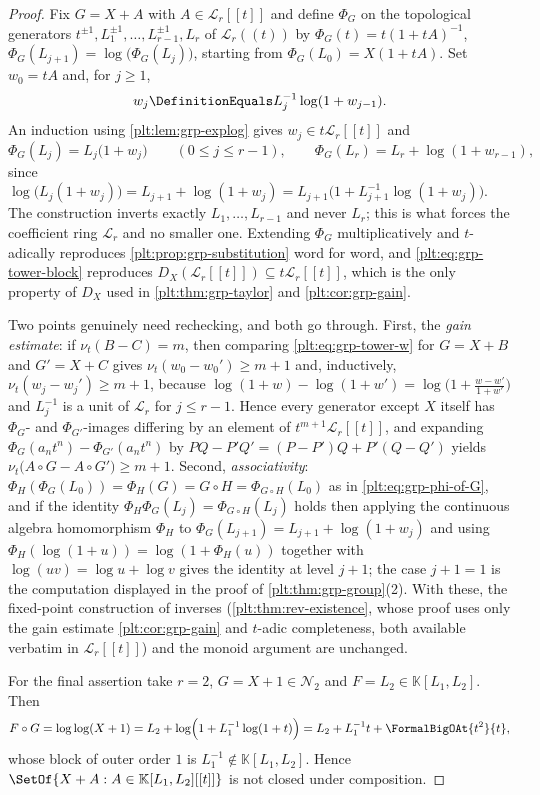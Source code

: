 \documentclass[11pt,oneside]{article}
\theoremstyle{plain}
\theoremstyle{definition}
\theoremstyle{remark}
\newcommand{\K}{\mathbb{K}}
\newcommand{\ordt}{\nu_{t}}                              %
\newcommand{\DX}{D_{X}}                                  %
\newcommand{\compose}{\mathbin{\circ}}
\begin{document}
\begin{proof}
Fix \(G=X+A\) with \(A\in\mathcal L_r[[t]]\) and define \(\Phi_G\) on the
topological generators \(t^{\pm1},L_1^{\pm1},\ldots,L_{r-1}^{\pm1},L_r\) of
\(\mathcal L_r((t))\) by \(\Phi_G(t)=t(1+tA)^{-1}\),
\(\Phi_G(L_{j+1})=\log\bigl(\Phi_G(L_j)\bigr)\), starting from
\(\Phi_G(L_0)=X(1+tA)\).  Set \(w_0=tA\) and, for \(j\ge1\),
\begin{equation}\label{plt:eq:grp-tower-w}
  w_j\DefinitionEquals L_j^{-1}\log(1+w_{j-1}).
\end{equation}
An induction using \cref{plt:lem:grp-explog} gives
\(w_j\in t\mathcal L_r[[t]]\) and
\[
  \Phi_G(L_j)=L_j\bigl(1+w_j\bigr)
  \qquad(0\le j\le r-1),
  \qquad
  \Phi_G(L_r)=L_r+\log(1+w_{r-1}),
\]
since \(\log\bigl(L_j(1+w_j)\bigr)=L_{j+1}+\log(1+w_j)
 =L_{j+1}\bigl(1+L_{j+1}^{-1}\log(1+w_j)\bigr)\).  The construction inverts
exactly \(L_1,\ldots,L_{r-1}\) and never \(L_r\); this is what forces the
coefficient ring \(\mathcal L_r\) and no smaller one.  Extending \(\Phi_G\)
multiplicatively and \(t\)-adically reproduces
\cref{plt:prop:grp-substitution} word for word, and
\eqref{plt:eq:grp-tower-block} reproduces \(\DX(\mathcal L_r[[t]])\subseteq
t\mathcal L_r[[t]]\), which is the only property of \(\DX\) used in
\cref{plt:thm:grp-taylor} and \cref{plt:cor:grp-gain}.

Two points genuinely need rechecking, and both go through.  First, the
\emph{gain estimate}: if \(\ordt(B-C)=m\), then comparing
\eqref{plt:eq:grp-tower-w} for \(G=X+B\) and \(G'=X+C\) gives
\(\ordt(w_0-w_0')\ge m+1\) and, inductively,
\(\ordt(w_j-w_j')\ge m+1\), because
\(\log(1+w)-\log(1+w')=\log\bigl(1+\frac{w-w'}{1+w'}\bigr)\) and \(L_j^{-1}\)
is a unit of \(\mathcal L_r\) for \(j\le r-1\).  Hence every generator except
\(X\) itself has \(\Phi_G\)- and \(\Phi_{G'}\)-images differing by an element of
\(t^{m+1}\mathcal L_r[[t]]\), and expanding
\(\Phi_G(a_nt^n)-\Phi_{G'}(a_nt^n)\) by
\(PQ-P'Q'=(P-P')Q+P'(Q-Q')\) yields
\(\ordt\bigl(A\compose G-A\compose G'\bigr)\ge m+1\).  Second,
\emph{associativity}: \(\Phi_H(\Phi_G(L_0))=\Phi_H(G)=G\compose H
 =\Phi_{G\compose H}(L_0)\) as in \eqref{plt:eq:grp-phi-of-G}, and if the
identity \(\Phi_H\Phi_G(L_j)=\Phi_{G\compose H}(L_j)\) holds then applying the
continuous algebra homomorphism \(\Phi_H\) to
\(\Phi_G(L_{j+1})=L_{j+1}+\log(1+w_j)\) and using
\(\Phi_H(\log(1+u))=\log(1+\Phi_H(u))\) together with
\(\log(uv)=\log u+\log v\) gives the identity at level \(j+1\); the case
\(j+1=1\) is the computation displayed in the proof of
\cref{plt:thm:grp-group}(2).  With these, the fixed-point construction of
inverses (\cref{plt:thm:rev-existence}, whose proof uses only the gain
estimate \cref{plt:cor:grp-gain} and \(t\)-adic completeness, both available
verbatim in \(\mathcal L_r[[t]]\)) and the monoid argument are unchanged.

For the final assertion take \(r=2\), \(G=X+1\in\mathcal N_2\) and
\(F=L_2\in\K[L_1,L_2]\).  Then
\[
  F\compose G=\log\log(X+1)
  =L_2+\log\Bigl(1+L_1^{-1}\log(1+t)\Bigr)
  =L_2+L_1^{-1}t+\FormalBigOAt{t^2}{t},
\]
whose block of outer order \(1\) is \(L_1^{-1}\notin\K[L_1,L_2]\).  Hence
\(\SetOf{X+A:A\in\K[L_1,L_2][[t]]}\) is not closed under composition.
\end{proof}
\end{document}
